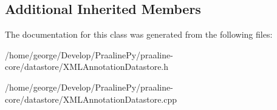 \subsection*{Additional Inherited Members}


The documentation for this class was generated from the following files\+:\begin{DoxyCompactItemize}
\item 
/home/george/\+Develop/\+Praaline\+Py/praaline-\/core/datastore/X\+M\+L\+Annotation\+Datastore.\+h\item 
/home/george/\+Develop/\+Praaline\+Py/praaline-\/core/datastore/X\+M\+L\+Annotation\+Datastore.\+cpp\end{DoxyCompactItemize}
